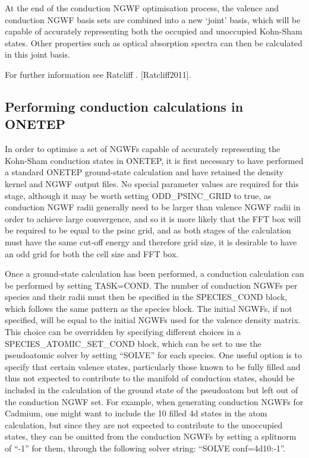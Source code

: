 \documentclass[letterpaper,10pt,english]{sphinxmanual}
\begin{document}
At the end of the conduction NGWF optimisation process, the valence and
conduction NGWF basis sets are combined into a new ‘joint’ basis, which
will be capable of accurately representing both the occupied and
unoccupied Kohn-Sham states. Other properties such as optical absorption
spectra can then be calculated in this joint basis.

For further information see Ratcliff . {[}Ratcliff2011{]}.


\subsection{Performing conduction calculations in ONETEP}
\label{\detokenize{conduction:performing-conduction-calculations-in-onetep}}
In order to optimise a set of NGWFs capable of accurately representing
the Kohn-Sham conduction states in ONETEP, it is first necessary to have
performed a standard ONETEP ground-state calculation and have retained
the density kernel and NGWF output files. No special parameter values
are required for this stage, although it may be worth setting
ODD\_PSINC\_GRID to true, as conduction NGWF radii generally need to be
larger than valence NGWF radii in order to achieve large convergence,
and so it is more likely that the FFT box will be required to be equal
to the psinc grid, and as both stages of the calculation must have the
same cut-off energy and therefore grid size, it is desirable to have an
odd grid for both the cell size and FFT box.

Once a ground-state calculation has been performed, a conduction
calculation can be performed by setting TASK=COND. The number of
conduction NGWFs per species and their radii must then be specified in
the SPECIES\_COND block, which follows the same pattern as the species
block. The initial NGWFs, if not specified, will be equal to the initial
NGWFs used for the valence density matrix. This choice can be overridden
by specifying different choices in a SPECIES\_ATOMIC\_SET\_COND block,
which can be set to use the pseudoatomic solver by setting “SOLVE” for
each species. One useful option is to specify that certain valence
states, particularly those known to be fully filled and thus not
expected to contribute to the manifold of conduction states, should be
included in the calculation of the ground state of the pseudoatom but
left out of the conduction NGWF set. For example, when generating
conduction NGWFs for Cadmium, one might want to include the 10 filled 4d
states in the atom calculation, but since they are not expected to
contribute to the unoccupied states, they can be omitted from the
conduction NGWFs by setting a splitnorm of “-1” for them, through the
following solver string: “SOLVE conf=4d10:-1”.
\end{document}

